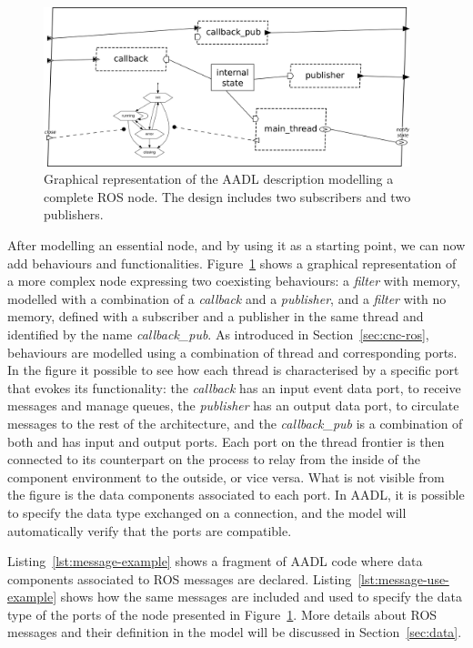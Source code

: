 \begin{figure}[t]
    \centering
    \includegraphics[width=0.95\textwidth]{gfx/sample_node}
    \caption{Graphical representation of the AADL description modelling a complete ROS node. The design includes two subscribers and two publishers.}\label{fig:sample-node}
\end{figure}

After modelling an essential node, and by using it as a starting point, we can now add behaviours and functionalities. Figure~\ref{fig:sample-node} shows a graphical representation of a more complex node expressing two coexisting behaviours: a \textit{filter} with memory, modelled with a combination of a \textit{callback} and a \textit{publisher}, and a \textit{filter} with no memory, defined with a subscriber and a publisher in the same thread and identified by the name \textit{callback\_pub}. As introduced in Section~\ref{sec:cnc-ros}, behaviours are modelled using a combination of thread and corresponding ports. In the figure it possible to see how each thread is characterised by a specific port that evokes its functionality: the \textit{callback} has an input event data port, to receive messages and manage queues, the \textit{publisher} has an output data port, to circulate messages to the rest of the architecture, and the \textit{callback\_pub} is a combination of both and has input and output ports. Each port on the thread frontier is then connected to its counterpart on the process to relay from the inside of the component environment to the outside, or vice versa. What is not visible from the figure is the data components associated to each port. In AADL, it is possible to specify the data type exchanged on a connection, and the model will automatically verify that the ports are compatible. 

Listing~\ref{lst:message-example} shows a fragment of AADL code where data components associated to ROS messages are declared. Listing~\ref{lst:message-use-example} shows how the same messages are included and used to specify the data type of the ports of the node presented in Figure~\ref{fig:sample-node}. More details about ROS messages and their definition in the model will be discussed in Section~\ref{sec:data}.


